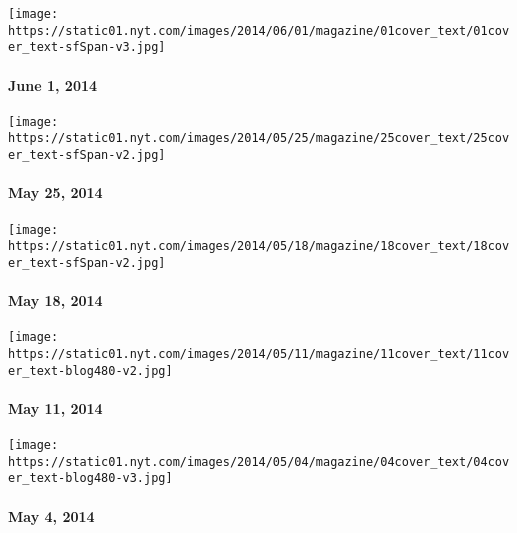 \href{http://www.nytimes.com/indexes/2014/06/01/magazine/index.html}{}

\texttt{[image: https://static01.nyt.com/images/2014/06/01/magazine/01cover\_text/01cover\_text-sfSpan-v3.jpg]}

\hypertarget{june-1-2014}{%
\paragraph{June 1, 2014}\label{june-1-2014}}

\href{http://www.nytimes.com/indexes/2014/05/25/magazine/index.html}{}

\texttt{[image: https://static01.nyt.com/images/2014/05/25/magazine/25cover\_text/25cover\_text-sfSpan-v2.jpg]}

\hypertarget{may-25-2014}{%
\paragraph{May 25, 2014}\label{may-25-2014}}

\href{http://www.nytimes.com/indexes/2014/05/18/magazine/index.html}{}

\texttt{[image: https://static01.nyt.com/images/2014/05/18/magazine/18cover\_text/18cover\_text-sfSpan-v2.jpg]}

\hypertarget{may-18-2014}{%
\paragraph{May 18, 2014}\label{may-18-2014}}

\href{http://www.nytimes.com/indexes/2014/05/11/magazine/index.html}{}

\texttt{[image: https://static01.nyt.com/images/2014/05/11/magazine/11cover\_text/11cover\_text-blog480-v2.jpg]}

\hypertarget{may-11-2014}{%
\paragraph{May 11, 2014}\label{may-11-2014}}

\href{http://www.nytimes.com/indexes/2014/05/04/magazine/index.html}{}

\texttt{[image: https://static01.nyt.com/images/2014/05/04/magazine/04cover\_text/04cover\_text-blog480-v3.jpg]}

\hypertarget{may-4-2014}{%
\paragraph{May 4, 2014}\label{may-4-2014}}

